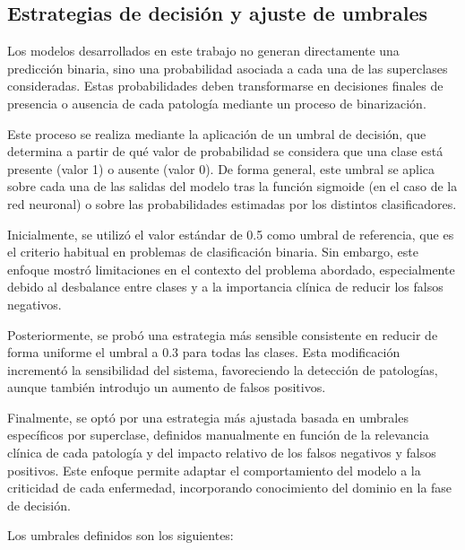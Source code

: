 \documentclass[12pt,a4paper,twoside]{book}
\begin{document}
\subsection{Estrategias de decisión y ajuste de umbrales}
\label{apartado_umbral}

Los modelos desarrollados en este trabajo no generan directamente una predicción binaria, sino una probabilidad asociada a cada una de las superclases consideradas. 
Estas probabilidades deben transformarse en decisiones finales de presencia o ausencia de cada patología mediante un proceso de binarización.

Este proceso se realiza mediante la aplicación de un umbral de decisión, que determina a partir de qué valor de probabilidad se considera que una clase está presente (valor 1) o ausente (valor 0). 
De forma general, este umbral se aplica sobre cada una de las salidas del modelo tras la función sigmoide (en el caso de la red neuronal) o sobre las probabilidades estimadas por los distintos clasificadores.

Inicialmente, se utilizó el valor estándar de 0.5 como umbral de referencia, que es el criterio habitual en problemas de clasificación binaria. 
Sin embargo, este enfoque mostró limitaciones en el contexto del problema abordado, especialmente debido al desbalance entre clases y a la importancia clínica de reducir los falsos negativos.

Posteriormente, se probó una estrategia más sensible consistente en reducir de forma uniforme el umbral a 0.3 para todas las clases. 
Esta modificación incrementó la sensibilidad del sistema, favoreciendo la detección de patologías, aunque también introdujo un aumento de falsos positivos.

Finalmente, se optó por una estrategia más ajustada basada en umbrales específicos por superclase, definidos manualmente en función de la relevancia clínica de cada patología y del impacto relativo de los falsos negativos y falsos positivos. 
Este enfoque permite adaptar el comportamiento del modelo a la criticidad de cada enfermedad, incorporando conocimiento del dominio en la fase de decisión.

Los umbrales definidos son los siguientes:
\end{document}
